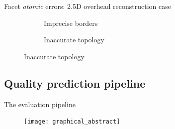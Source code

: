 \documentclass[10pt, export]{beamer}
\begin{document}
\begin{frame}{Facet \textit{atomic} errors: 2.5D overhead reconstruction case}
\begin{figure}
\begin{center}
\begin{subfigure}{.33\textwidth}
                        \caption{\label{fig::fac_footprint} Imprecise borders}
                    \end{subfigure}
                    \begin{subfigure}{.33\textwidth}
                        \caption{\label{fig::fac_height} Inaccurate topology}
                    \end{subfigure}
                \end{center}
            \end{figure}
        \end{frame}
        \subsection{Quality prediction pipeline}
            \begin{frame}{The evaluation pipeline}
                \begin{figure}
                    \texttt{[image: graphical\_abstract]}
                \end{figure}
            \end{frame}
\end{document}
